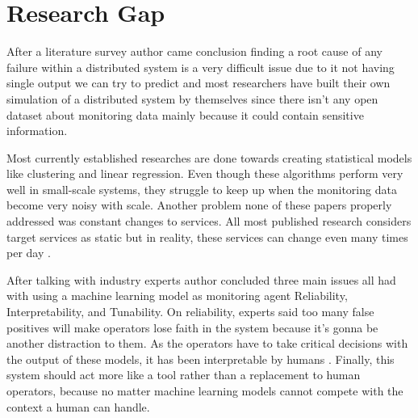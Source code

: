 
{\let\clearpage\relax\chapter{Research Gap}}

After a literature survey author came conclusion finding a root cause of any failure within a distributed system is a very difficult issue due to it not having single output we can try to predict and most researchers have built their own simulation of a distributed system by themselves since there isn't any open dataset about monitoring data mainly because it could contain sensitive information. 

Most currently established researches are done towards creating statistical models like clustering and linear regression. Even though these algorithms perform very well in small-scale systems, they struggle to keep up when the monitoring data become very noisy with scale. Another problem none of these papers properly  addressed was constant changes to services. All most published research considers target services as static but in reality, these services can change even many times per day \citep{GoingtoM51:online}.

After talking with industry experts author concluded three main issues all had with using a machine learning model as monitoring agent Reliability, Interpretability, and Tunability. On reliability, experts said too many false positives will make operators lose faith in the system because it's gonna be another distraction to them. As the operators have to take critical decisions with the output of these models, it has been interpretable by humans \citep{ribeiro2016should}. Finally, this system should act more like a tool rather than a replacement to human operators, because no matter machine learning models cannot compete with the context a human can handle. 
